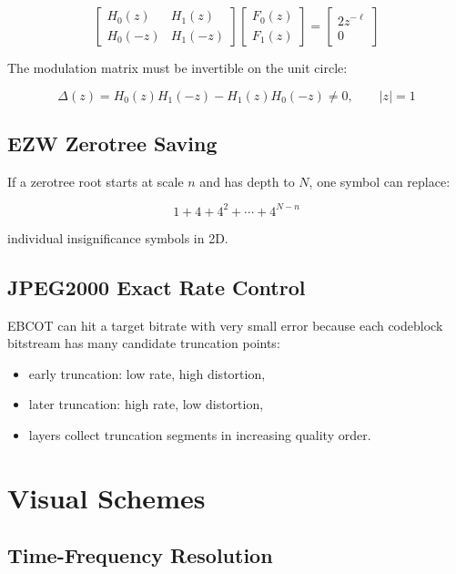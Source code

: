 \[
\begin{bmatrix}
H_0(z) & H_1(z)\\
H_0(-z) & H_1(-z)
\end{bmatrix}
\begin{bmatrix}
F_0(z)\\
F_1(z)
\end{bmatrix}
=
\begin{bmatrix}
2z^{-\ell}\\
0
\end{bmatrix}
\]

The modulation matrix must be invertible on the unit circle:

\[
\Delta(z)
=
H_0(z)H_1(-z)-H_1(z)H_0(-z)
\neq0,
\qquad |z|=1
\]

\subsection{EZW Zerotree Saving}

If a zerotree root starts at scale $n$ and has depth to $N$, one symbol can replace:

\[
1+4+4^2+\cdots+4^{N-n}
\]

individual insignificance symbols in 2D.

\subsection{JPEG2000 Exact Rate Control}

EBCOT can hit a target bitrate with very small error because each codeblock bitstream has many candidate truncation points:

\begin{itemize}
  \item early truncation: low rate, high distortion,
  \item later truncation: high rate, low distortion,
  \item layers collect truncation segments in increasing quality order.
\end{itemize}

\section{Visual Schemes}

\subsection{Time-Frequency Resolution}

